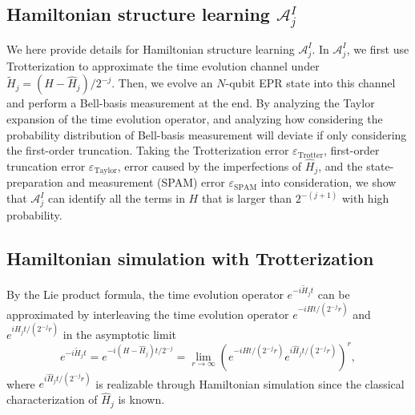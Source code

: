 \documentclass[twocolumn,superscriptaddress,aps,showpacs,amsmath,amstex,amssymb,citeautoscript,floatfix,pra,preprintnumbers]{revtex4-2}
\theoremstyle{plain}
\theoremstyle{plain}
\theoremstyle{plain}
\theoremstyle{plain}
\theoremstyle{plain}
\theoremstyle{plain}
\begin{document}
\begin{appendix}
\section{Hamiltonian structure learning \texorpdfstring{$\mathcal{A}^I_j$}{A I j}\label{app:structure_learning}}
We here provide details for Hamiltonian structure learning $\mathcal{A}^I_j$. In $\mathcal{A}^I_j$, we first use Trotterization to approximate the time evolution channel under $\tilde{H}_j = (H-\hat{H}_j)/2^{-j}$. Then, we evolve an $N$-qubit EPR state into this channel and perform a Bell-basis measurement at the end. By analyzing the Taylor expansion of the time evolution operator, and analyzing how considering the probability distribution of Bell-basis measurement will deviate if only considering the first-order truncation. Taking the Trotterization error $\varepsilon_{\text{Trotter}}$, first-order truncation error $\varepsilon_{\text{Taylor}}$, error caused by the imperfections of $\hat{H}_j$, and the state-preparation and measurement (SPAM) error $\varepsilon_{\text{SPAM}}$ into consideration, we show that $\mathcal{A}^I_j$ can identify all the terms in $H$ that is larger than $2^{-(j+1)}$ with high probability.


\subsection{Hamiltonian simulation with Trotterization\label{app:Trotter}}
\label{sec:Hamiltonian_simulation_with_Trotterization}
By the Lie product formula, the time evolution operator $e^{-i\tilde{H}_jt}$ can be approximated by interleaving the time evolution operator $e^{-iHt/(2^{-j}r)}$ and $e^{i\hat{H}_jt/(2^{-j}r)}$ in the asymptotic limit
\begin{equation}
     e^{-i\tilde{H}_jt} = e^{-i(H-\hat{H}_j)t/2^{-j}} = \lim_{r\rightarrow \infty} \left(e^{-iHt/(2^{-j}r)}e^{i\hat{H}_jt/(2^{-j}r)}\right)^r,
\end{equation}
where $e^{i\hat{H}_jt/(2^{-j}r)}$ is realizable through Hamiltonian simulation since the classical characterization of $\hat{H}_j$ is known.


\end{appendix}
\end{document}
